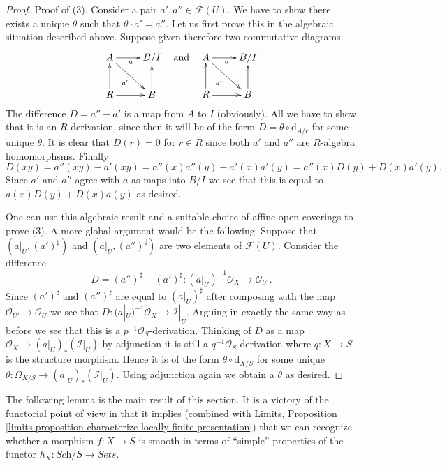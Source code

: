 \begin{proof}
\medskip\noindent
Proof of (3). Consider a pair $a', a'' \in \mathcal{F}(U)$.
We have to show there exists a unique $\theta$ such that
$\theta \cdot a' = a''$. Let us first prove this in the algebraic
situation described above. Suppose given therefore two
commutative diagrams
$$
\xymatrix{
A \ar[r]_a \ar[rd]_{a'} & B/I \\
R \ar[r] \ar[u] & B \ar[u]
}
\quad \text{and} \quad
\xymatrix{
A \ar[r]_a \ar[rd]_{a''} & B/I \\
R \ar[r] \ar[u] & B \ar[u]
}
$$
The difference $D = a'' - a'$ is a map from $A$ to $I$ (obviously).
All we have to show that it is an $R$-derivation, since then it will
be of the form $D = \theta \circ \text{d}_{A/r}$ for some unique
$\theta$. It is clear that $D(r) = 0$ for $r \in R$ since both $a'$
and $a''$ are $R$-algebra homomorphsms. Finally
$$
D(xy) =
a''(xy) - a'(xy) = a''(x) a''(y) - a'(x) a'(y) =
a''(x)D(y) + D(x) a'(y).
$$
Since $a'$ and $a''$ agree with $a$ as maps into $B/I$ we see that
this is equal to $a(x) D(y) + D(x) a(y)$ as desired.

\medskip\noindent
One can use this algebraic result and a suitable choice of affine
open coverings to prove (3). A more global argument would be the following.
Suppose that $(a|_U, (a')^\sharp)$ and $(a|_U, (a'')^\sharp)$ are
two elements of $\mathcal{F}(U)$. Consider the difference
$$
D = (a'')^\sharp - (a')^\sharp : 
(a|_U)^{-1}\mathcal{O}_X \longrightarrow \mathcal{O}_{U'}.
$$
Since $(a')^\sharp$ and $(a'')^\sharp$ are equal to $(a|_U)^\sharp$
after composing with the map $\mathcal{O}_{U'} \to \mathcal{O}_{U}$
we see that $D : (a|_U)^{-1}\mathcal{O}_X \to \mathcal{I}|_U$.
Arguing in exactly the same way as before we see that this is
a $p^{-1}\mathcal{O}_S$-derivation.
Thinking of $D$ as a map $\mathcal{O}_X \to (a|_U)_*(\mathcal{I}|_U)$
by adjunction it is still a $q^{-1}\mathcal{O}_S$-derivation
where $q : X \to S$ is the structure morphism.
Hence it is of the form
$\theta \circ \text{d}_{X/S}$ for some unique
$\theta : \Omega_{X/S} \to (a|_U)_*(\mathcal{I}|_U)$.
Using adjunction again we obtain a $\theta$ as desired.
\end{proof}

\noindent
The following lemma is the main result of this section. It is a victory of the
functorial point of view in that it implies (combined with 
Limits,
Proposition \ref{limits-proposition-characterize-locally-finite-presentation})
that we can recognize whether a morphism $f : X \to S$ is smooth in terms of
``simple'' properties of the functor $h_X : \textit{Sch}/S \to \textit{Sets}$.

